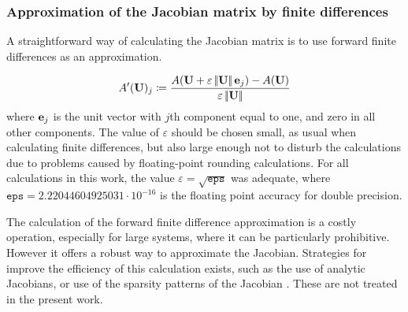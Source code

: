 \subsubsection{Approximation of the Jacobian matrix by finite differences}

A straightforward way of calculating the Jacobian matrix is to use forward finite differences as an approximation.

\begin{equation}
	A'(\textbf{U})_j \coloneqq \frac{A(\textbf{U}+\varepsilon\left|\!\left| {\textbf{U}} \right|\!\right|\textbf{e}_j )-A(\textbf{U})  }{\varepsilon\left|\!\left| {\textbf{U}} \right|\!\right|}
\end{equation}
where $\textbf{e}_j$ is the unit vector with $j$th component equal to one, and zero in all other components. The value of $\varepsilon$ should be chosen small, as usual when calculating finite differences, but also large enough not to disturb the calculations due to problems caused by floating-point rounding calculations.  For all calculations in this work, the value $\varepsilon = \sqrt{\mathtt{eps}}$ was adequate, where $\mathtt{eps} = 2.22044604925031 \cdot 10^{-16}$ is the floating point accuracy for double precision.

The calculation of the forward finite difference approximation is a costly operation, especially for large systems, where it can be particularly prohibitive. However it offers a robust way to approximate the Jacobian. Strategies for improve the efficiency of this calculation exists, such as the use of analytic Jacobians, or use of the sparsity patterns of the Jacobian \parencite{kelleyIterativeMethodsLinear1995}. These are not treated in the present work. 
